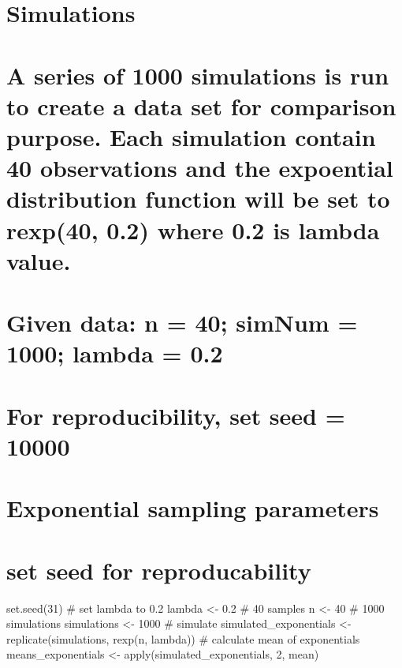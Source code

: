 \documentclass[
]{article}
\begin{document}
\hypertarget{simulations}{%
\section{Simulations}\label{simulations}}

\hypertarget{a-series-of-1000-simulations-is-run-to-create-a-data-set-for-comparison-purpose.-each-simulation-contain-40-observations-and-the-expoential-distribution-function-will-be-set-to-rexp40-0.2-where-0.2-is-lambda-value.}{%
\section{A series of 1000 simulations is run to create a data set for
comparison purpose. Each simulation contain 40 observations and the
expoential distribution function will be set to rexp(40, 0.2) where 0.2
is lambda
value.}\label{a-series-of-1000-simulations-is-run-to-create-a-data-set-for-comparison-purpose.-each-simulation-contain-40-observations-and-the-expoential-distribution-function-will-be-set-to-rexp40-0.2-where-0.2-is-lambda-value.}}

\hypertarget{given-data-n-40-simnum-1000-lambda-0.2}{%
\section{Given data: n = 40; simNum = 1000; lambda =
0.2}\label{given-data-n-40-simnum-1000-lambda-0.2}}

\hypertarget{for-reproducibility-set-seed-10000}{%
\section{For reproducibility, set seed =
10000}\label{for-reproducibility-set-seed-10000}}

\hypertarget{exponential-sampling-parameters}{%
\section{Exponential sampling
parameters}\label{exponential-sampling-parameters}}

\hypertarget{set-seed-for-reproducability}{%
\section{set seed for
reproducability}\label{set-seed-for-reproducability}}

set.seed(31) \# set lambda to 0.2 lambda \textless- 0.2 \# 40 samples n
\textless- 40 \# 1000 simulations simulations \textless- 1000 \#
simulate simulated\_exponentials \textless- replicate(simulations,
rexp(n, lambda)) \# calculate mean of exponentials means\_exponentials
\textless- apply(simulated\_exponentials, 2, mean)
\end{document}
